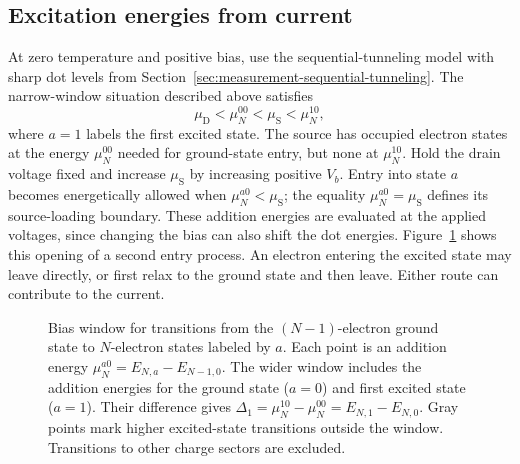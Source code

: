 \subsection{Excitation energies from current}
\label{sec:measurement-excitation-current}
At zero temperature and positive bias, use the sequential-tunneling
model with sharp dot levels from
Section~\ref{sec:measurement-sequential-tunneling}.
The narrow-window situation described above satisfies
\[
 \mu_{\mathrm D}<\mu_N^{00}<\mu_{\mathrm S}<\mu_N^{10},
\]
where $a=1$ labels the first excited state. The source has occupied
electron states at the energy $\mu_N^{00}$ needed for ground-state
entry, but none at $\mu_N^{10}$. Hold the drain voltage fixed and
increase $\mu_{\mathrm S}$ by increasing positive $V_b$.
Entry into state $a$ becomes energetically allowed when
$\mu_N^{a0}<\mu_{\mathrm S}$; the equality
$\mu_N^{a0}=\mu_{\mathrm S}$ defines its source-loading boundary.
These addition energies are evaluated at the applied voltages,
since changing the bias can also shift the dot energies.
Figure~\ref{fig:transport-excitation-window}
shows this opening of a second entry process. An electron entering
the excited state may leave directly, or first relax to the ground
state and then leave. Either route can contribute to the current.

\begin{figure}[htbp]
 \centering
 
 \caption{Bias window for transitions from the $(N-1)$-electron
 ground state to $N$-electron states labeled by $a$. Each point is
 an addition energy $\mu_N^{a0}=E_{N,a}-E_{N-1,0}$.
 The wider window includes the addition energies for the ground
 state ($a=0$) and first excited state ($a=1$). Their difference gives
 $\Delta_1=\mu_N^{10}-\mu_N^{00}=E_{N,1}-E_{N,0}$.
 Gray points mark higher excited-state transitions outside the
 window. Transitions to other charge sectors are excluded.}
 \label{fig:transport-excitation-window}
\end{figure}

